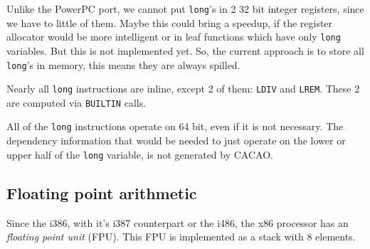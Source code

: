 Unlike the PowerPC port, we cannot put \texttt{long}'s in 2 32 bit
integer registers, since we have to little of them. Maybe this could
bring a speedup, if the register allocator would be more intelligent
or in leaf functions which have only \texttt{long} variables. But this
is not implemented yet. So, the current approach is to store all
\texttt{long}'s in memory, this means they are always spilled.

Nearly all \texttt{long} instructions are inline, except 2 of them:
\texttt{LDIV} and \texttt{LREM}. These 2 are computed via
\texttt{BUILTIN} calls.

All of the \texttt{long} instructions operate on 64 bit, even if it is
not necessary. The dependency information that would be needed to just
operate on the lower or upper half of the \texttt{long} variable, is
not generated by CACAO.


\subsection{Floating point arithmetic}

Since the i386, with it's i387 counterpart or the i486, the x86
processor has an \textit{floating point unit} (FPU). This FPU is
implemented as a stack with 8 elements.
